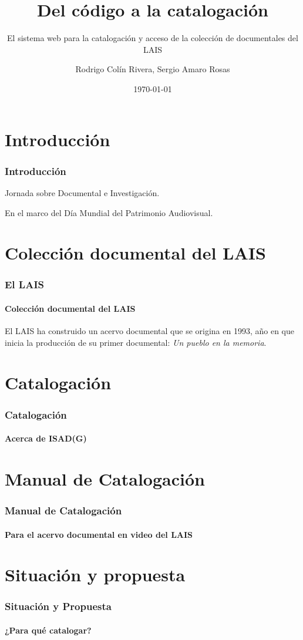 \documentclass{beamer}
\title{Del código a la catalogación}
\subtitle{El sistema web para la catalogación y acceso de la colección de documentales del LAIS}
\author{Rodrigo Colín Rivera, Sergio Amaro Rosas}
\institute
{
  Laboratorio Audiovisual de Investigación Social\\
  Instituto de Investigaciones Dr. José María Luis Mora
}
\date{\today}
\begin{document}
\frame{\titlepage} %

\section{Introducción}
\begin{frame}
	\frametitle{Introducción}
	Jornada sobre Documental e Investigación.
	
	En el marco del Día Mundial del Patrimonio Audiovisual.
\end{frame}

\section{Colección documental del LAIS}
\begin{frame}
	\frametitle{El LAIS}
	\framesubtitle{Colección documental del LAIS}
	
	El LAIS ha construido un acervo documental que se origina en 1993, año en que inicia la producción de su primer documental: \textit{Un pueblo en la memoria}.
	
	
\end{frame}

\section{Catalogación}
\begin{frame}
	\frametitle{Catalogación}
	\framesubtitle{Acerca de ISAD(G)}
	
	
\end{frame}

\section{Manual de Catalogación}
\begin{frame}
	\frametitle{Manual de Catalogación}
	\framesubtitle{Para el acervo documental en video del LAIS}
	
	
\end{frame}

\section{Situación y propuesta}
\begin{frame}
	\frametitle{Situación y Propuesta}
	\framesubtitle{¿Para qué catalogar?}
	
	
\end{frame}
\end{document}
